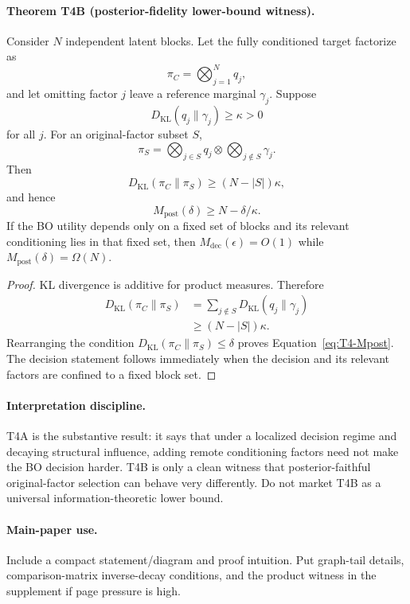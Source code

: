 \paragraph{Theorem T4B (posterior-fidelity lower-bound witness).}
Consider $N$ independent latent blocks.  Let the fully conditioned target
factorize as
\[
    \pi_C=\bigotimes_{j=1}^N q_j,
\]
and let omitting factor $j$ leave a reference marginal $\gamma_j$.  Suppose
\[
    D_{\mathrm{KL}}(q_j\|\gamma_j)\ge\kappa>0
\]
for all $j$.  For an original-factor subset $S$,
\[
    \pi_S
    =\bigotimes_{j\in S}q_j
     \otimes
     \bigotimes_{j\notin S}\gamma_j.
\]
Then
\begin{equation}
    D_{\mathrm{KL}}(\pi_C\|\pi_S)
    \ge (N-|S|)\kappa,
\end{equation}
and hence
\begin{equation}
    M_{\mathrm{post}}(\delta)
    \ge N-\delta/\kappa.
    \label{eq:T4-Mpost}
\end{equation}
If the BO utility depends only on a fixed set of blocks and its relevant
conditioning lies in that fixed set, then $M_{\mathrm{dec}}(\epsilon)=O(1)$
while $M_{\mathrm{post}}(\delta)=\Omega(N)$.

\begin{proof}
KL divergence is additive for product measures.  Therefore
\begin{align*}
D_{\mathrm{KL}}(\pi_C\|\pi_S)
&=
\sum_{j\notin S}D_{\mathrm{KL}}(q_j\|\gamma_j)\\
&\ge(N-|S|)\kappa.
\end{align*}
Rearranging the condition
$D_{\mathrm{KL}}(\pi_C\|\pi_S)\le\delta$ proves
Equation~\eqref{eq:T4-Mpost}.  The decision statement follows immediately when
the decision and its relevant factors are confined to a fixed block set.
\end{proof}

\paragraph{Interpretation discipline.}
T4A is the substantive result: it says that under a localized decision regime and
decaying structural influence, adding remote conditioning factors need not make
the BO decision harder.  T4B is only a clean witness that posterior-faithful
original-factor selection can behave very differently.  Do not market T4B as a
universal information-theoretic lower bound.

\paragraph{Main-paper use.}
Include a compact statement/diagram and proof intuition.  Put graph-tail details,
comparison-matrix inverse-decay conditions, and the product witness in the
supplement if page pressure is high.

